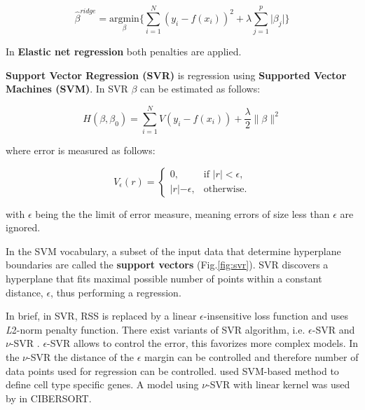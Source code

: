 \documentclass[12pt,]{book}
\theoremstyle{definition}
\theoremstyle{definition}
\theoremstyle{definition}
\theoremstyle{remark}
\begin{document}
\begin{equation}
\hat{\beta}^{ridge} = \underset{\beta}{\text{argmin}}\{\sum_{i = 1}^{N}(y_i - f(x_i))^2 + \lambda\sum_{j=1}^{p}\lvert\beta_j\rvert\}\label{eq:lasso}
\end{equation}

In \textbf{Elastic net regression} both penalties are applied.

\textbf{Support Vector Regression (SVR)} is regression using
\textbf{Supported Vector Machines (SVM)}. In SVR \(\beta\) can be
estimated as follows:

\begin{equation}
H(\beta,\beta_0) = \sum_{i=1}^{N} V (y_i − f(x_i)) +\frac{λ}2\lVert\beta\rVert^2 \label{eq:svr1}
\end{equation}

where error is measured as follows:

\begin{equation}
V_\epsilon(r) = \begin{cases}
    0, & \text{if $\lvert r \rvert < \epsilon$,}\\
    \rvert r\lvert - \epsilon, & \text{otherwise}. 
  \end{cases}  \label{eq:svr2}
\end{equation}

with \(\epsilon\) being the the limit of error measure, meaning errors
of size less than \(\epsilon\) are ignored.

In the SVM vocabulary, a subset of the input data that determine
hyperplane boundaries are called the \textbf{support vectors}
(Fig.\ref{fig:svr}). SVR discovers a hyperplane that fits maximal
possible number of points within a constant distance, \(\epsilon\), thus
performing a regression.

In brief, in SVR, RSS is replaced by a linear \(\epsilon\)-insensitive
loss function and uses \emph{L}2-norm penalty function. There exist
variants of SVR algorithm, i.e. \(\epsilon\)-SVR \citep{drucker1997} and
\(\nu\)-SVR \citep{Scholkopf2000}. \(\epsilon\)-SVR allows to control
the error, this favorizes more complex models. In the \(\nu\)-SVR the
distance of the \(\epsilon\) margin can be controlled and therefore
number of data points used for regression can be controlled.
\citet{Ju2013} used SVM-based method to define cell type specific genes.
A model using \(\nu\)-SVR with linear kernel was used by
\citet{Newman2015} in CIBERSORT.
\end{document}
